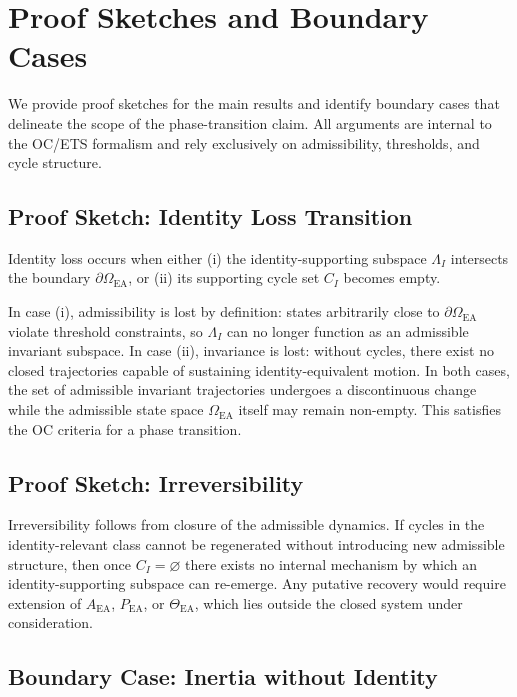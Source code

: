 ﻿\section{Proof Sketches and Boundary Cases}

We provide proof sketches for the main results and identify boundary cases that
delineate the scope of the phase-transition claim. All arguments are internal to
the OC/ETS formalism and rely exclusively on admissibility, thresholds, and cycle
structure.

\subsection{Proof Sketch: Identity Loss Transition}

Identity loss occurs when either
(i) the identity-supporting subspace $\Lambda_I$ intersects the boundary
$\partial\Omega_{\mathrm{EA}}$, or
(ii) its supporting cycle set $C_I$ becomes empty.

In case (i), admissibility is lost by definition: states arbitrarily close to
$\partial\Omega_{\mathrm{EA}}$ violate threshold constraints, so $\Lambda_I$ can
no longer function as an admissible invariant subspace. In case (ii), invariance
is lost: without cycles, there exist no closed trajectories capable of sustaining
identity-equivalent motion. In both cases, the set of admissible invariant
trajectories undergoes a discontinuous change while the admissible state space
$\Omega_{\mathrm{EA}}$ itself may remain non-empty. This satisfies the OC criteria
for a phase transition.

\subsection{Proof Sketch: Irreversibility}

Irreversibility follows from closure of the admissible dynamics. If cycles in the
identity-relevant class cannot be regenerated without introducing new admissible
structure, then once $C_I = \varnothing$ there exists no internal mechanism by
which an identity-supporting subspace can re-emerge. Any putative recovery would
require extension of $A_{\mathrm{EA}}$, $P_{\mathrm{EA}}$, or
$\Theta_{\mathrm{EA}}$, which lies outside the closed system under
consideration.

\subsection{Boundary Case: Inertia without Identity}

